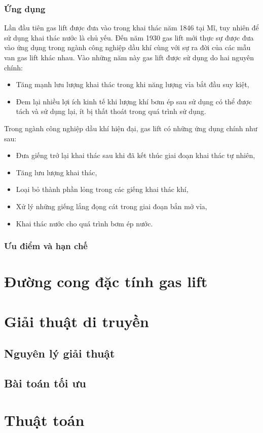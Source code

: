 \documentclass[12pt,a4paper]{report}
\begin{document}
\subsubsection{Ứng dụng}
Lần đầu tiên gas lift được đưa vào trong khai thác năm 1846 tại Mĩ, tuy nhiên để sử dụng khai thác nước là chủ yếu. Đến năm 1930 gas lift mới thực sự được đưa vào ứng dụng trong ngành công nghiệp dầu khí cùng với sự ra đời của các mẫu van gas lift khác nhau. Vào những năm này gas lift được sử dụng do hai nguyên chính:
	\begin{itemize}
		\item Tăng mạnh lưu lượng khai thác trong khi năng lượng vỉa bắt đầu suy kiệt,
		\item Đem lại nhiều lợi ích kinh tế khi lượng khí bơm ép sau sử dụng có thể được tách và sử dụng lại, ít bị thất thoát trong quá trình sử dụng.
	\end{itemize}
Trong ngành công nghiệp dầu khí hiện đại, gas lift có những ứng dụng chính như sau:
	\begin{itemize}
		\item Đưa giếng trở lại khai thác sau khi đã kết thúc giai đoạn khai thác tự nhiên,
		\item Tăng lưu lượng khai thác,
		\item Loại bỏ thành phần lỏng trong các giếng khai thác khí,
		\item Xử lý những giếng lắng đọng cát trong giai đoạn bắn mở vỉa,
		\item Khai thác nước cho quá trình bơm ép nước.\\
	\end{itemize}

\subsubsection{Ưu điểm và hạn chế}


\section{Đường cong đặc tính gas lift}

\section{Giải thuật di truyền}
\subsection{Nguyên lý giải thuật}

\subsection{Bài toán tối ưu}

\section{Thuật toán}
\end{document}
